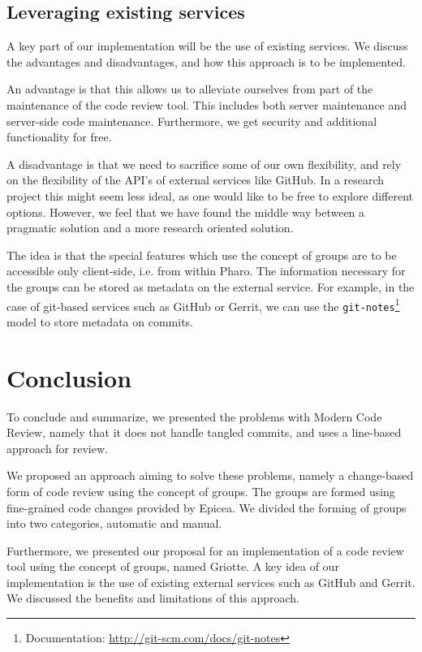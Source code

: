 \documentclass[conference,a4paper]{IEEEtran}
\newcommand{\Ep}{Epicea}
\newcommand{\Gr}{Griotte}
\newcommand{\code}[1]{\texttt{#1}}
\begin{document}
\subsection{Leveraging existing services}
\label{sec:lever-exist-serv}
A key part of our implementation will be the use of existing
services. We discuss the advantages and disadvantages, and how this
approach is to be implemented.

An advantage is that this allows us to alleviate ourselves from part
of the maintenance of the code review tool. This includes both server
maintenance and server-side code maintenance. Furthermore, we get
security and additional functionality for free.

A disadvantage is that we need to sacrifice some of our own
flexibility, and rely on the flexibility of the API's of external
services like GitHub. In a research project this might seem less
ideal, as one would like to be free to explore different
options. However, we feel that we have found the middle way between a
pragmatic solution and a more research oriented solution.

The idea is that the special features which use the concept of groups
are to be accessible only client-side, i.e. from within Pharo. The
information necessary for the groups can be stored as metadata on the
external service. For example, in the case of git-based services such
as GitHub or Gerrit, we can use the
\code{git-notes}\footnote{Documentation:
  \url{http://git-scm.com/docs/git-notes}} model to store metadata on
commits.

\section{Conclusion}
\label{sec:conclusion}
To conclude and summarize, we presented the problems with Modern Code
Review, namely that it does not handle tangled commits, and uses a
line-based approach for review.

We proposed an approach aiming to solve these problems, namely a
change-based form of code review using the concept of groups. The
groups are formed using fine-grained code changes provided by \Ep. We
divided the forming of groups into two categories, automatic and
manual.

Furthermore, we presented our proposal for an implementation of a code
review tool using the concept of groups, named \Gr. A key idea of our
implementation is the use of existing external services such as GitHub
and Gerrit. We discussed the benefits and limitations of this
approach.



\end{document}
